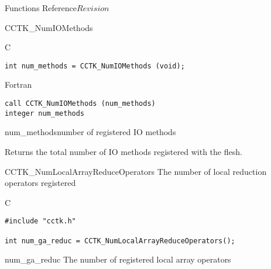 \begin{cactuspart}{ Functions Reference}{}{$Revision$}
\begin{FunctionDescription}{CCTK\_NumIOMethods}
\begin{SynopsisSection}
\begin{Synopsis}{C}
\begin{verbatim}
int num_methods = CCTK_NumIOMethods (void);
\end{verbatim}
\end{Synopsis}
\begin{Synopsis}{Fortran}
\begin{verbatim}
call CCTK_NumIOMethods (num_methods)
integer num_methods
\end{verbatim}
\end{Synopsis}
\end{SynopsisSection}

\begin{ParameterSection}
\begin{Parameter}{num\_methods}number of registered IO methods\end{Parameter}
\end{ParameterSection}

\begin{Discussion}
Returns the total number of IO methods registered with the flesh.
\end{Discussion}
\end{FunctionDescription}



\begin{FunctionDescription}{CCTK\_NumLocalArrayReduceOperators}
\label{CCTK-NumLocalArrayReduceOperators}
The number of local reduction operators registered

\begin{SynopsisSection}
\begin{Synopsis}{C}
\begin{verbatim}
#include "cctk.h"

int num_ga_reduc = CCTK_NumLocalArrayReduceOperators();
\end{verbatim}
\end{Synopsis}
\end{SynopsisSection}

\begin{ResultSection}
\begin{Result}{num\_ga\_reduc}
The number of registered local array operators
\end{Result}
\end{ResultSection}



\end{FunctionDescription}
\end{cactuspart}
